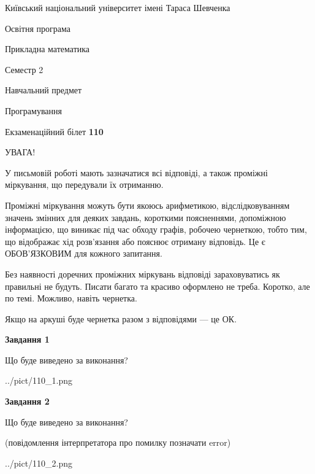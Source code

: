 \documentclass[12pt, ukrainian]{article}
\begin{document}
{{\begin {small}\par
{ \center  Київський національний університет імені Тараса Шевченка \par}
{\parbox {5 cm}{Освітня програма \hfill}{\parbox {7 cm}{Прикладна математика\hfill}}\parbox {6 cm}{\hfill Семестр 2}}\par
{\parbox {5 cm} {Навчальний предмет \hfill}\parbox {7 cm}{Програмування \hfill}\parbox {6cm}{\hfill}\par}\vspace{-7pt} \end{small}}{\center Екзаменаційний білет \No \textbf
{ 110 }\par}}
{
\begin {large}
УВАГА!

У письмовій роботі мають зазначатися всі відповіді, а також проміжні міркування, що передували їх отриманню.

Проміжні міркування можуть бути якоюсь арифметикою, відслідковуванням зна\-чень змінних для деяких завдань,
короткими поясненнями, допоміжною інформацією, що виникає під час обходу графів, робочею чернеткою,
тобто тим, що відображає хід розв’язання або пояснює отриману відповідь.
Це є ОБОВ’ЯЗКОВИМ для кожного запитання.

Без наявності доречних проміжних міркувань відповіді зараховуватись як правиль\-ні не будуть.
Писати багато та красиво оформлено не треба. Коротко, але по темі. Можли\-во, навіть чернетка.

Якщо на аркуші буде чернетка разом з відповідями --- це ОК.

\newpage

{\begin {center}\textbf{Завдання 1}\end {center}}\par
Що буде виведено за виконання?\par
\begin{center}
	{../pict/110_1.png}
\end{center}
\newpage

{\begin {center}\textbf{Завдання 2}\end {center}}\par
Що буде виведено за виконання?\par
 (повідомлення інтерпретатора про помилку позначати error)\par
\begin{center}
	{../pict/110_2.png}
\end{center}
\newpage


\end{large}}
\end{document}
